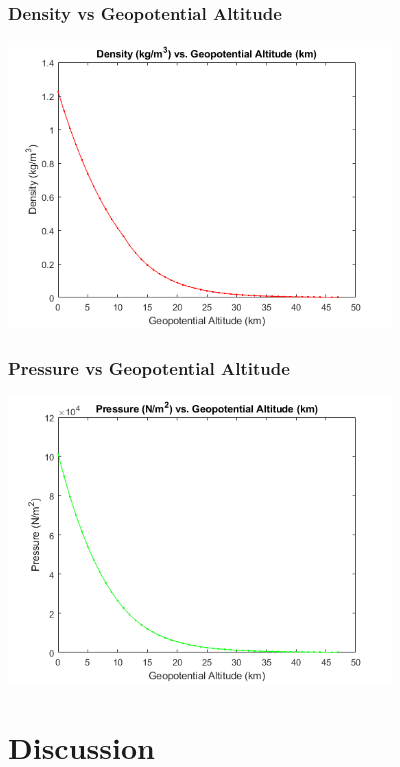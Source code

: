 \documentclass{article}
\begin{document}
\subsubsection{Density vs Geopotential Altitude}
\includegraphics [height=3in]{graph2.png}

\subsubsection{Pressure vs Geopotential Altitude}
\includegraphics [height=3in]{graph3.png}

\section{Discussion}
\end{document}
